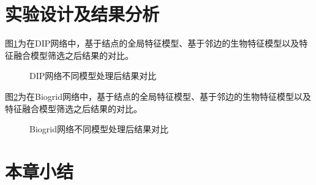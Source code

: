 \section{实验设计及结果分析}
\label{section:MPNN:experience}
图\ref{fig:result/DIP/fusion}为在DIP网络中，基于结点的全局特征模型、基于邻边的生物特征模型以及特征融合模型筛选之后结果的对比。
\begin{figure}[htbp]
    \centering
    \vskip0.2cm
    \caption{DIP网络不同模型处理后结果对比}
    \label{fig:result/DIP/fusion}
\end{figure}

图\ref{fig:result/Biogrid/fusion}为在Biogrid网络中，基于结点的全局特征模型、基于邻边的生物特征模型以及特征融合模型筛选之后结果的对比。
\begin{figure}[htbp]
    \centering
    \vskip0.2cm
    \caption{Biogrid网络不同模型处理后结果对比}
    \label{fig:result/Biogrid/fusion}
\end{figure}
\section{本章小结}
\label{section:MPNN:summary}
